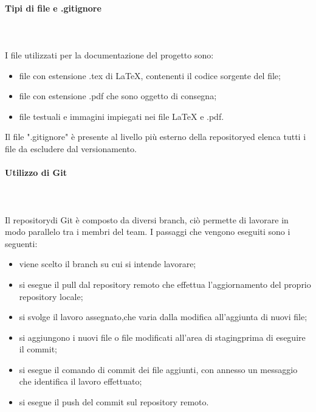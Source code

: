 	\paragraph{Tipi di file e .gitignore} \mbox{}\\ \mbox{}\\
	I file utilizzati per la documentazione del progetto sono:
	\begin{itemize}
		\item file con estensione .tex di \LaTeX{}, contenenti il codice sorgente del file;
		\item file con estensione .pdf che sono oggetto di consegna;
		\item file testuali e immagini impiegati nei file \LaTeX{} e .pdf.
	\end{itemize}			
	Il file ".gitignore" è presente al livello più esterno della repository\glosp ed elenca tutti i file da escludere dal versionamento. 
	\paragraph{Utilizzo di Git} \mbox{}\\ \mbox{}\\
	Il repository\glosp di Git è composto da diversi branch, ciò permette di lavorare in modo parallelo tra i membri del team.  
	I passaggi che vengono eseguiti sono i seguenti:
	\begin{itemize}
		\item viene scelto il branch su cui si intende lavorare;
		\item si esegue il pull dal repository remoto che effettua l'aggiornamento del proprio repository locale;
		\item si svolge il lavoro assegnato,che varia dalla modifica all'aggiunta di nuovi file;
		\item si aggiungono i nuovi file o file modificati all'area di staging\glosp prima di eseguire il commit;
		\item si esegue il comando di commit dei file aggiunti, con annesso un messaggio che identifica il lavoro effettuato;
		\item si esegue il push del commit sul repository remoto.
	\end{itemize}
